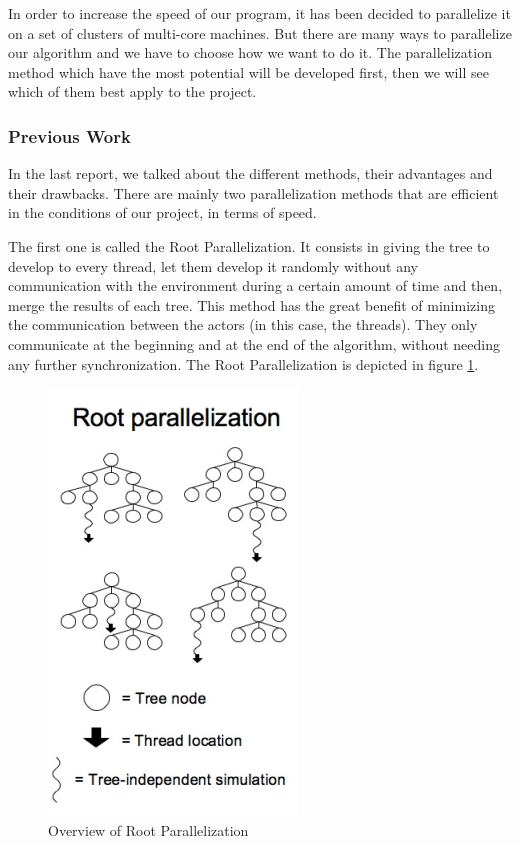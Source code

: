 In order to increase the speed of our program, it has been decided to parallelize it on a set of clusters of multi-core machines. But there are many ways to parallelize our algorithm and we have to choose how we want to do it. The parallelization method which have the most potential will be developed first, then we will see which of them best apply to the project.
\subsubsection{Previous Work}
In the last report, we talked about the different methods, their advantages and their drawbacks. There are mainly two parallelization methods that are efficient in the conditions of our project, in terms of speed.

The first one is called the Root Parallelization. It consists in giving the tree to develop to every thread, let them develop it randomly without any communication with the environment
during a certain amount of time and then, merge the results of each tree.
This method has the great benefit of minimizing the communication between the actors (in this case, the threads).
They only communicate at the beginning and at the end of the algorithm, without needing any further synchronization. The Root Parallelization is depicted in figure \ref{fig:root}.

\begin{figure}[!ht] 
\centerline{\includegraphics[scale=0.60]{3Methods/3.1Parallelization_Method/root.png}}
   \caption{Overview of Root Parallelization \cite{parallel_comp}}
\label{fig:root}
\end{figure}


